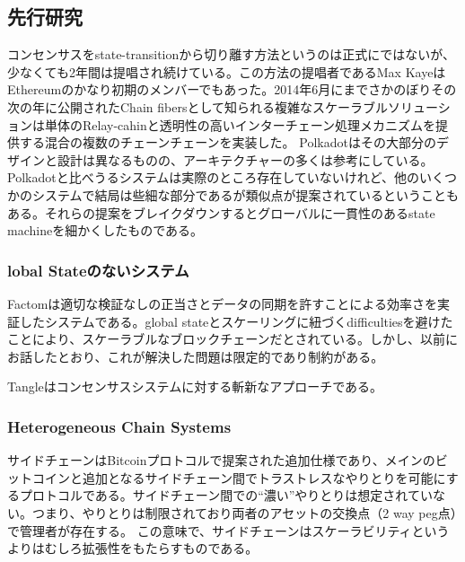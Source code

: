 \hypertarget{ux5148ux884cux7814ux7a76}{%
\subsection{先行研究}\label{ux5148ux884cux7814ux7a76}}

コンセンサスをstate-transitionから切り離す方法というのは正式にではないが、少なくても2年間は提唱され続けている。この方法の提唱者であるMax
KayeはEthereumのかなり初期のメンバーでもあった。2014年6月にまでさかのぼりその次の年に公開されたChain
fibersとして知られる複雑なスケーラブルソリューションは単体のRelay-cahinと透明性の高いインターチェーン処理メカニズムを提供する混合の複数のチェーンチェーンを実装した。
Polkadotはその大部分のデザインと設計は異なるものの、アーキテクチャーの多くは参考にしている。Polkadotと比べうるシステムは実際のところ存在していないけれど、他のいくつかのシステムで結局は些細な部分であるが類似点が提案されているということもある。それらの提案をブレイクダウンするとグローバルに一貫性のあるstate
machineを細かくしたものである。

\hypertarget{lobal-stateux306eux306aux3044ux30b7ux30b9ux30c6ux30e0}{%
\subsubsection{lobal
Stateのないシステム}\label{lobal-stateux306eux306aux3044ux30b7ux30b9ux30c6ux30e0}}

Factomは適切な検証なしの正当さとデータの同期を許すことによる効率さを実証したシステムである。global
stateとスケーリングに紐づくdifficultiesを避けたことにより、スケーラブルなブロックチェーンだとされている。しかし、以前にお話したとおり、これが解決した問題は限定的であり制約がある。

Tangleはコンセンサスシステムに対する斬新なアプローチである。

\hypertarget{heterogeneous-chain-systems}{%
\subsubsection{Heterogeneous Chain
Systems}\label{heterogeneous-chain-systems}}

サイドチェーンはBitcoinプロトコルで提案された追加仕様であり、メインのビットコインと追加となるサイドチェーン間でトラストレスなやりとりを可能にするプロトコルである。サイドチェーン間での``濃い''やりとりは想定されていない。つまり、やりとりは制限されており両者のアセットの交換点（2
way peg点）で管理者が存在する。
この意味で、サイドチェーンはスケーラビリティというよりはむしろ拡張性をもたらすものである。

